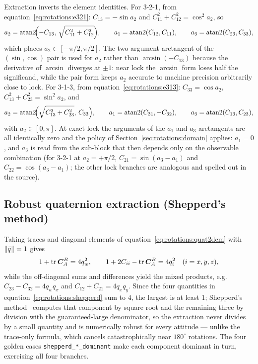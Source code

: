 Extraction inverts the element identities. For 3-2-1, from
equation~\eqref{eq:rotations:e321}: $C_{13} = -\sin a_2$ and
$C_{11}^2 + C_{12}^2 = \cos^2 a_2$, so
\begin{equation}
  a_2 = \operatorname{atan2}\!\Bigl(-C_{13},\, \sqrt{C_{11}^2 + C_{12}^2}
  \Bigr),
  \qquad
  a_1 = \operatorname{atan2}(C_{12}, C_{11}),
  \qquad
  a_3 = \operatorname{atan2}(C_{23}, C_{33}),
  \label{eq:rotations:e321extract}
\end{equation}
which places $a_2 \in [-\pi/2, \pi/2]$. The two-argument arctangent of the
$(\sin, \cos)$ pair is used for $a_2$ rather than $\arcsin(-C_{13})$
because the derivative of $\arcsin$ diverges at $\pm 1$: near lock the
$\arcsin$ form loses half the significand, while the pair form keeps $a_2$
accurate to machine precision arbitrarily close to lock. For 3-1-3, from
equation~\eqref{eq:rotations:e313}: $C_{33} = \cos a_2$,
$C_{13}^2 + C_{23}^2 = \sin^2 a_2$, and
\begin{equation}
  a_2 = \operatorname{atan2}\!\Bigl(\sqrt{C_{13}^2 + C_{23}^2},\, C_{33}
  \Bigr),
  \qquad
  a_1 = \operatorname{atan2}(C_{31}, -C_{32}),
  \qquad
  a_3 = \operatorname{atan2}(C_{13}, C_{23}),
  \label{eq:rotations:e313extract}
\end{equation}
with $a_2 \in [0, \pi]$. At exact lock the arguments of the $a_1$ and
$a_3$ arctangents are all identically zero and the policy of
Section~\ref{sec:rotations:domain} applies: $a_1 = 0$, and $a_3$ is read
from the sub-block that then depends only on the observable combination
(for 3-2-1 at $a_2 = +\pi/2$, $C_{21} = \sin(a_3 - a_1)$ and
$C_{22} = \cos(a_3 - a_1)$; the other lock branches are analogous and
spelled out in the source).

\subsection{Robust quaternion extraction (Shepperd's method)}

Taking traces and diagonal elements of
equation~\eqref{eq:rotations:quat2dcm} with $\left\lVert \bar{q} \right\rVert = 1$ gives
\begin{equation}
  1 + \operatorname{tr}\bm{C}_{A}^{B} = 4 q_w^2,
  \qquad
  1 + 2 C_{ii} - \operatorname{tr}\bm{C}_{A}^{B} = 4 q_i^2
  \quad (i = x, y, z),
  \label{eq:rotations:shepperd}
\end{equation}
while the off-diagonal sums and differences yield the mixed products, e.g.
$C_{23} - C_{32} = 4 q_w q_x$ and $C_{12} + C_{21} = 4 q_x q_y$. Since the
four quantities in equation~\eqref{eq:rotations:shepperd} sum to $4$, the
largest is at least $1$; Shepperd's method~\cite{shepperd1978} computes
that component by square root and the remaining three by division with the
guaranteed-large denominator, so the extraction never divides by a small
quantity and is numerically robust for every attitude --- unlike the
trace-only formula, which cancels catastrophically near $180^\circ$
rotations. The four golden cases \texttt{shepperd\_*\_dominant} make each
component dominant in turn, exercising all four branches.

